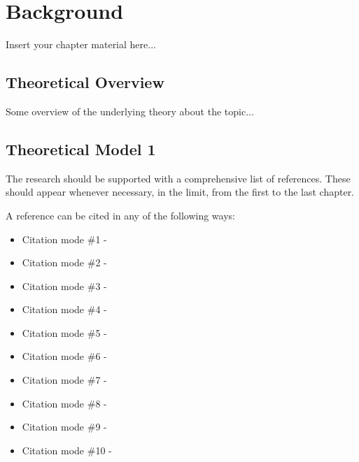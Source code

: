 
\chapter{Background}
\label{chapter:background}

Insert your chapter material here...


\section{Theoretical Overview}
\label{section:overview}

Some overview of the underlying theory about the topic...


\section{Theoretical Model 1}
\label{section:theory1}

The research should be supported with a comprehensive list of references.
These should appear whenever necessary, in the limit, from the first to the last chapter.

A reference can be cited in any of the following ways:
%
\begin{itemize}
  \item Citation mode \#1 - \quad \cite{Marta:AeroBest2021}
  \item Citation mode \#2 - \quad \citet{Marta:AeroBest2021}
  \item Citation mode \#3 - \quad \citep{Marta:AeroBest2021}
  \item Citation mode \#4 - \quad \citet*{Marta:AeroBest2021}
  \item Citation mode \#5 - \quad \citep*{Marta:AeroBest2021}
  \item Citation mode \#6 - \quad \citealt{Marta:AeroBest2021}
  \item Citation mode \#7 - \quad \citealp{Marta:AeroBest2021}
  \item Citation mode \#8 - \quad \citeauthor{Marta:AeroBest2021}
  \item Citation mode \#9 - \quad \citeyear{Marta:AeroBest2021}
  \item Citation mode \#10 - \quad \citeyearpar{Marta:AeroBest2021}
\end{itemize}

